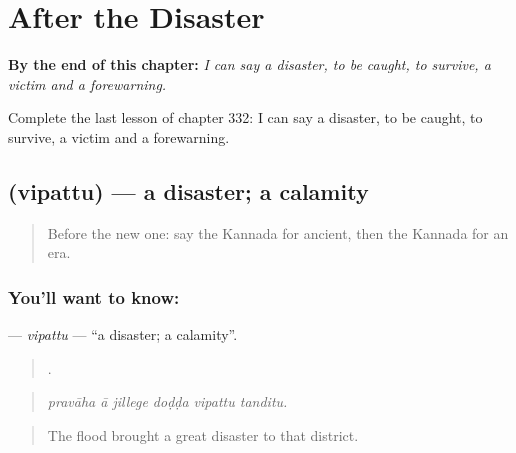 
\chapter{After the Disaster}
\label{ch:ka-after-the-disaster}

\begin{chapteropening}
\textbf{By the end of this chapter:} \emph{I can say a disaster, to be caught, to survive, a victim and a forewarning.}

Complete the last lesson of chapter 332: I can say a disaster, to be caught, to survive, a victim and a forewarning.
\end{chapteropening}

\section[\texorpdfstring{\kn{ವಿಪತ್ತು} (vipattu)}{ವಿಪತ್ತು (vipattu)}]{ (vipattu) — a disaster; a calamity}

\label{lesson:KA-C332-vipattu}



\begin{quote}
Before the new one: say the Kannada for ancient, then the Kannada for an era.
\end{quote}

\subsection*{You'll want to know: }
\textbf{} — \emph{vipattu} — \textquotedblleft{}a disaster; a calamity\textquotedblright{}.

\begin{quote}
     .
\end{quote}

\begin{quote}
\emph{pravāha ā jillege doḍḍa vipattu tanditu.}
\end{quote}

\begin{quote}
The flood brought a great disaster to that district.
\end{quote}

